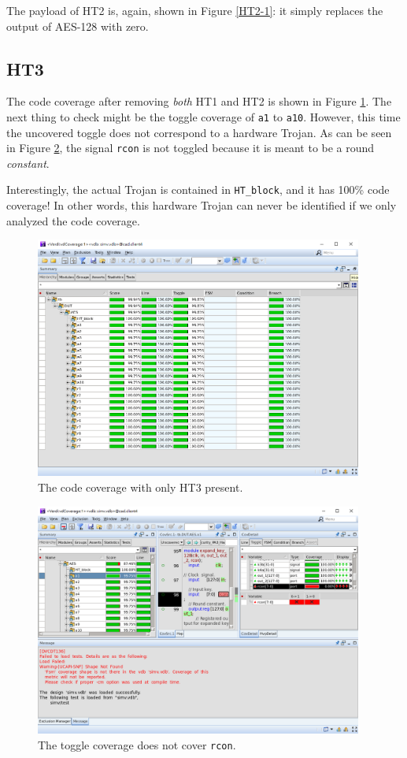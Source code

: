 \documentclass{article}
\begin{document}
The payload of HT2 is, again, shown in Figure \ref{HT2-1}: it simply replaces the output of AES-128 with zero.

\subsection{HT3}

The code coverage after removing \textit{both} HT1 and HT2 is shown in Figure \ref{nHT12}. The next thing to check might be the toggle coverage of \verb|a1| to \verb|a10|. However, this time the uncovered toggle does not correspond to a hardware Trojan. As can be seen in Figure \ref{rcon_toggle}, the signal \verb|rcon| is not toggled because it is meant to be a round \textit{constant}.

Interestingly, the actual Trojan is contained in \verb|HT_block|, and it has 100\% code coverage! In other words, this hardware Trojan can never be identified if we only analyzed the code coverage.

\begin{figure}[p] \centering
\includegraphics[width=0.96\textwidth]{nHT12}
\caption{The code coverage with only HT3 present.}
\label{nHT12}
\end{figure}

\begin{figure}[p] \centering
\includegraphics[width=0.96\textwidth]{rcon_toggle}
\caption{The toggle coverage does not cover \texttt{rcon}.}
\label{rcon_toggle}
\end{figure}
\end{document}
